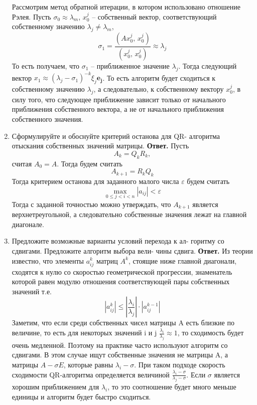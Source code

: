 \documentclass{article}
\begin{document}
\begin{enumerate}
        Рассмотрим метод обратной итерации, в котором использовано отношение Рэлея. 
        Пусть \mbox{$\sigma_0 \approx \lambda_m$}, $x_0^j$ -- собственный вектор, соответствующий собственному значению $\lambda_j \neq \lambda_m$,
        \begin{equation*}
            \sigma_1 = \dfrac{(Ax_0^j,\, x_0^j)}{(x_0^j,\, x_0^j)} \approx \lambda_j 
        \end{equation*}
        То есть получаем, что $\sigma_1 $ -- приближенное значение $\lambda_j$. 
        Тогда следующий вектор \mbox{$x_1 \approx (\lambda_j - \sigma_1)^{-k} \xi_j \boldsymbol{e_j}$}.
        То есть алгоритм будет сходиться к собственному значению $\lambda_j$, а следовательно, к собственному 
        вектору $x_0^j$, в силу того, что следующее приближение зависит только от начального приближения собственного вектора, а не от 
        начального приближения собственного значения. 

        \item Сформулируйте и обоснуйте критерий останова для QR-
        алгоритма отыскания собственных значений матрицы.
        \newline
        {\bfseries Ответ. } 
        Пусть 
        \begin{equation*}
            A_k = Q_k R_k,
        \end{equation*}
        считая $A_0 = A$.
        Тогда будем считать 
        \begin{equation*}
            A_{k+1} = R_{k} Q_{k}
        \end{equation*}
        Тогда критерием останова для заданного малого числа $\varepsilon$ 
        будем считать 
        \begin{equation*}
            \max_{0 \leqslant j<i<n} |a_{ij}| < \varepsilon
        \end{equation*}
        Тогда с заданной точностью можно утверждать, что $A_{k+1}$ является верхнетреугольной, а 
        следовательно собственные значения лежат на главной диагонале. 
        \item Предложите возможные варианты условий перехода к ал-
        горитму со сдвигами. Предложите алгоритм выбора вели-
        чины сдвига.
        \newline
        {\bfseries Ответ. } 
        Из теории известно, что элементы $a_{ij}^k$ матриц $A^k$, стоящие ниже главной диагонали, сходятся к нулю со скоростью геометрической прогрессии, знаменатель которой равен модулю отношения соответствующей пары собственных значений т.е.
	\[
	|a_{ij}^k|\le|\frac{\lambda_i}{\lambda_j}| \cdot |a_{ij}^{k-1}|
	\]
	Заметим, что если среди собственных чисел матрицы A есть
	близкие по величине, то есть для некоторых значений i и j $\frac{\lambda_i}{\lambda_j} \approx 1$, то сходимость будет очень медленной. Поэтому на практике часто используют алгоритм со сдвигами. В этом случае ищут собственные значения не матрицы A, а матрицы $A-\sigma E$, которые равны $\lambda_i - \sigma$. При таком подходе скорость сходимости QR-алгоритма определяется величиной $\frac{\lambda_i-\sigma}{\lambda_j- \sigma}$. Если $\sigma$ является хорошим приближением для $\lambda_i$, то это соотношение будет много меньше единицы и алгоритм будет быстро сходиться.
	

\end{enumerate}
\end{document}
